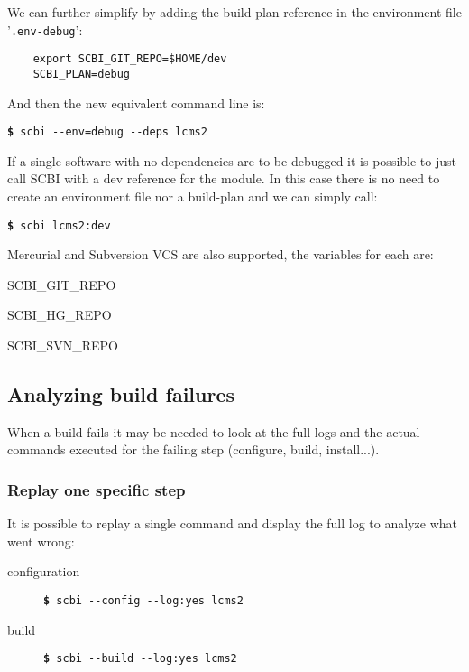 \documentclass[a4paper,12pt,twoside]{article}
\newcommand{\file}[1]{'{\texttt{#1}}'}
\newcommand{\cmd}[1]{\tabto{1cm}\hspace{0.5cm}\texttt{\textbf{\$} #1}}
\newcommand{\ddash}{-{}-}
\begin{document}
We can further simplify by adding the build-plan reference in the environment file \file{.env-debug}:

\begin{lstlisting}
	export SCBI_GIT_REPO=$HOME/dev
	SCBI_PLAN=debug
\end{lstlisting}

And then the new equivalent command line is:

\cmd{scbi \ddash{}env=debug \ddash{}deps lcms2}

If a single software with no dependencies are to be debugged it is possible to just call SCBI with a dev reference for the module. In this case there is no need to create an environment file nor a build-plan and we can simply call:

\cmd{scbi lcms2:dev}

Mercurial and Subversion VCS are also supported, the variables for each are:

\begin{description}[style=standard]
	\item[Git] \tabto{3cm} SCBI\_GIT\_REPO
	\item[Mercurial] \tabto{3cm} SCBI\_HG\_REPO
	\item[Subversion] \tabto{3cm} SCBI\_SVN\_REPO
\end{description}

\subsection{Analyzing build failures}
\label{debugging}

When a build fails it may be needed to look at the full logs and the actual commands executed for the failing step (configure, build, install...).

\subsubsection{Replay one specific step}

It is possible to replay a single command and display the full log to analyze what went wrong:

\begin{description}
	\item[configuration] \tabto{3cm}  \cmd{scbi \ddash{}config \ddash{}log:yes lcms2}
	\item[build] \tabto{3cm} \cmd{scbi \ddash{}build \ddash{}log:yes lcms2}
\end{description}
\end{document}
